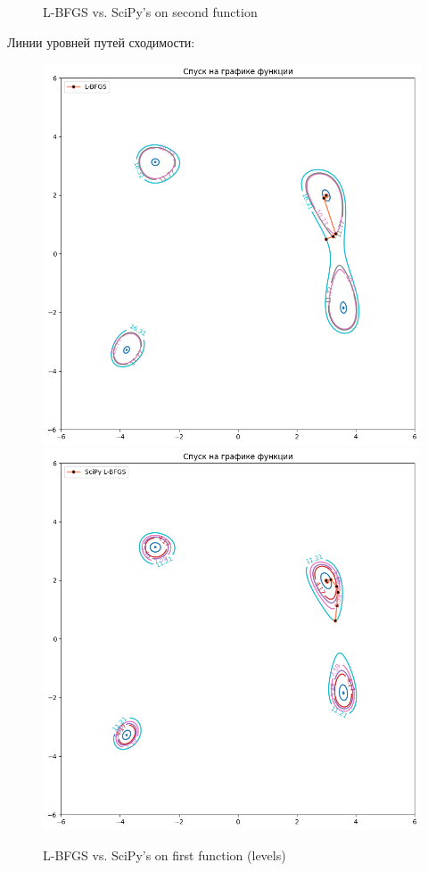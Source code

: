 \documentclass[12pt, a4paper, oneside, final]{article}
\begin{document}
\begin{figure}[H]
		\caption*{L-BFGS vs. SciPy's on second function}
	\end{figure}
	Линии уровней путей сходимости:
	\begin{figure}[H]
		\centering
		\includegraphics[scale = 0.35]{Image/T2A_F2_LBFGS_LEVELS.png}
		\includegraphics[scale = 0.35]{Image/T2A_F2_scipy_LBFGS_LEVELS.png}
		\caption*{L-BFGS vs. SciPy's on first function (levels)}
	\end{figure}
\end{document}
